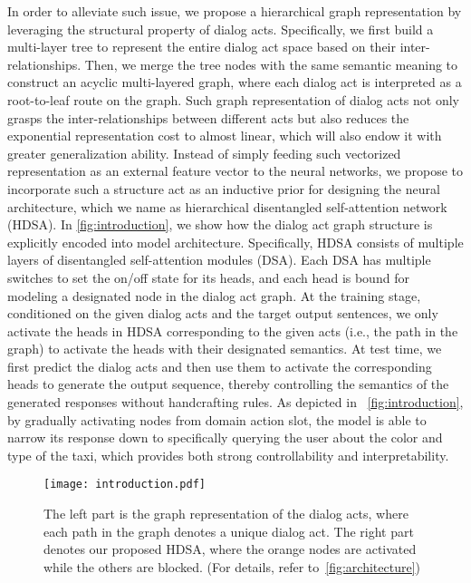 \documentclass[11pt,a4paper]{article}
\begin{document}
In order to alleviate such issue, we propose a hierarchical graph representation by leveraging the structural property of dialog acts. Specifically, we first build a multi-layer tree to represent the entire dialog act space based on their inter-relationships. Then, we merge the tree nodes with the same semantic meaning to construct an acyclic multi-layered graph, where each dialog act is interpreted as a root-to-leaf route on the graph. Such graph representation of dialog acts not only grasps the inter-relationships between different acts but also reduces the exponential representation cost to almost linear, which will also endow it with greater generalization ability. Instead of simply feeding such vectorized representation as an external feature vector to the neural networks, we propose to incorporate such a structure act as an inductive prior for designing the neural architecture, which we name as hierarchical disentangled self-attention network (HDSA).
In \autoref{fig:introduction}, we show how the dialog act graph structure is explicitly encoded into model architecture. Specifically, HDSA consists of multiple layers of disentangled self-attention modules (DSA). Each DSA has multiple switches to set the on/off state for its heads, and each head is bound for modeling a designated node in the dialog act graph. At the training stage, conditioned on the given dialog acts and the target output sentences, we only activate the heads in HDSA corresponding to the given acts (i.e., the path in the graph) to activate the heads with their designated semantics. At test time, we first predict the dialog acts and then use them to activate the corresponding heads to generate the output sequence, thereby controlling the semantics of the generated responses without handcrafting rules. As depicted in ~\autoref{fig:introduction}, by gradually activating nodes from domain  action  slot, the model is able to narrow its response down to specifically querying the user about the color and type of the taxi, which provides both strong controllability and interpretability.
\begin{figure}[t]
\begin{center}
    \texttt{[image: introduction.pdf]}
    \end{center}
    \caption{The left part is the graph representation of the dialog acts, where each path in the graph denotes a unique dialog act. The right part denotes our proposed HDSA, where the orange nodes are activated while the others are blocked. (For details, refer to~\autoref{fig:architecture})}
    \label{fig:introduction}
\end{figure}
\end{document}
